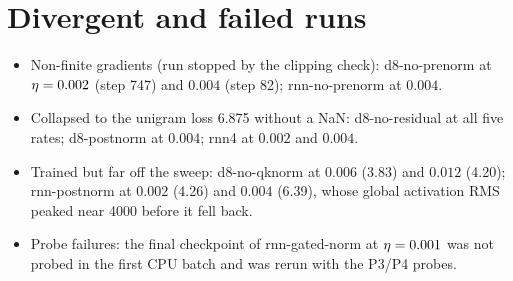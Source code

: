 \section{Divergent and failed runs}
\begin{itemize}\setlength\itemsep{0pt}
\item Non-finite gradients (run stopped by the clipping check): d8-no-prenorm at $\eta=0.002$ (step 747) and $0.004$ (step 82); rnn-no-prenorm at $0.004$.
\item Collapsed to the unigram loss 6.875 without a NaN: d8-no-residual at all five rates; d8-postnorm at $0.004$; rnn4 at $0.002$ and $0.004$.
\item Trained but far off the sweep: d8-no-qknorm at $0.006$ (3.83) and $0.012$ (4.20); rnn-postnorm at $0.002$ (4.26) and $0.004$ (6.39), whose global activation RMS peaked near 4000 before it fell back.
\item Probe failures: the final checkpoint of rnn-gated-norm at $\eta=0.001$ was not probed in the first CPU batch and was rerun with the P3/P4 probes.
\studentfailures
\end{itemize}
